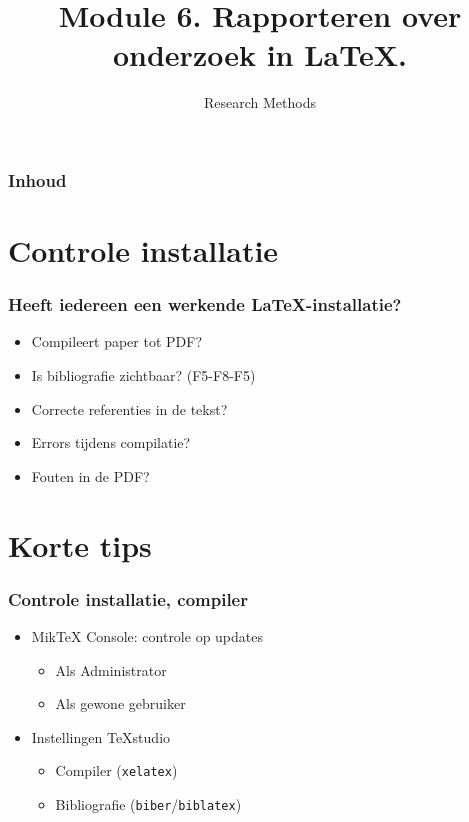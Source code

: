 \documentclass[aspectratio=169]{beamer}
\title{Module 6. Rapporteren over onderzoek in \LaTeX{}.}
\subtitle{Research Methods}
\author{\lecturers}   %
\date{\academicyear}
\begin{document}
\begin{frame}
  \maketitle
\end{frame}

\begin{frame}
  \frametitle{Inhoud}

  \tableofcontents
\end{frame}

\section{Controle installatie}

\begin{frame}
  \frametitle{Heeft iedereen een werkende {\LaTeX}-installatie?}

  \begin{itemize}
    \item Compileert paper tot PDF?
    \item Is bibliografie zichtbaar? (F5-F8-F5)
    \item Correcte referenties in de tekst?
    \item Errors tijdens compilatie?
    \item Fouten in de PDF?
  \end{itemize}

\end{frame}

\section{Korte tips}


\begin{frame}
  \frametitle{Controle installatie, compiler}

  \begin{itemize}
    \item Mik{\TeX} Console: controle op updates
          \begin{itemize}
            \item Als Administrator
            \item Als gewone gebruiker
          \end{itemize}
    \item Instellingen TeXstudio
          \begin{itemize}
            \item Compiler (\texttt{xelatex})
            \item Bibliografie (\texttt{biber}/\texttt{biblatex})
          \end{itemize}
  \end{itemize}

\end{frame}
\end{document}
